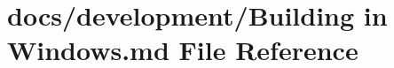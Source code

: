\hypertarget{Building_01in_01Windows_8md}{\section{docs/development/\+Building in Windows.\+md File Reference}
\label{Building_01in_01Windows_8md}
}
